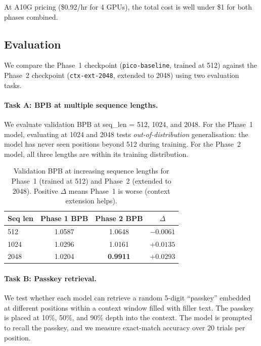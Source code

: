 \documentclass[a4paper,12pt]{article}
\begin{document}
\noindent At A10G pricing (\$0.92/hr for 4 GPUs), the total cost is
well under \$1 for both phases combined.

\subsection{Evaluation}

We compare the Phase~1 checkpoint (\texttt{pico-baseline}, trained at
512) against the Phase~2 checkpoint (\texttt{ctx-ext-2048}, extended
to 2048) using two evaluation tasks.

\paragraph{Task A: BPB at multiple sequence lengths.}
We evaluate validation BPB at seq\_len = 512, 1024, and 2048.  For
the Phase~1 model, evaluating at 1024 and 2048 tests
\emph{out-of-distribution} generalisation: the model has never seen
positions beyond 512 during training.  For the Phase~2 model, all
three lengths are within its training distribution.

\begin{table}[H]
\centering
\begin{tabular}{lccc}
\toprule
\textbf{Seq len} & \textbf{Phase 1 BPB} & \textbf{Phase 2 BPB} & \textbf{$\Delta$} \\
\midrule
512  & 1.0587 & 1.0648 & $-0.0061$ \\
1024 & 1.0296 & 1.0161 & $+0.0135$ \\
2048 & 1.0204 & \textbf{0.9911} & $+0.0293$ \\
\bottomrule
\end{tabular}
\caption{Validation BPB at increasing sequence lengths for Phase~1 (trained at 512)
  and Phase~2 (extended to 2048).  Positive $\Delta$ means Phase~1 is worse (context extension helps).}
\label{tab:ctx_ext_bpb}
\end{table}

\paragraph{Task B: Passkey retrieval.}
We test whether each model can retrieve a random 5-digit ``passkey''
embedded at different positions within a context window filled with
filler text.  The passkey is placed at 10\%, 50\%, and 90\% depth into
the context.  The model is prompted to recall the passkey, and we
measure exact-match accuracy over 20 trials per position.\\
\end{document}
